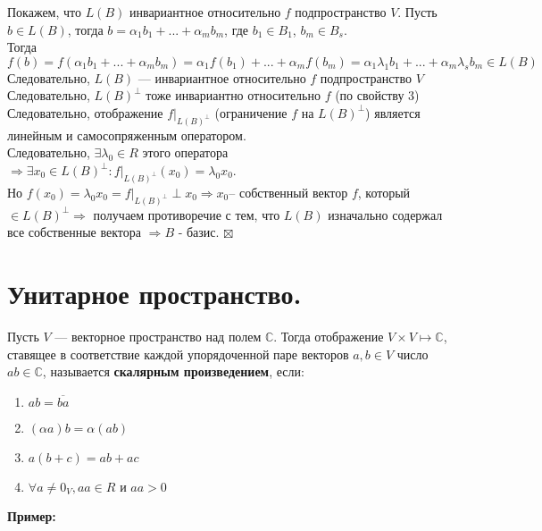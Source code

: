 \documentclass[a4paper, 12pt]{report}
\begin{document}
	Покажем, что $L(B)$ инвариантное относительно $f$ подпространство $V$. Пусть $b \in L(B)$,
	тогда $b = \alpha_1b_1 + ... + \alpha_mb_m$, где $b_1 \in B_1$, $b_m \in B_s$. \\
	Тогда $f(b) = f(\alpha_1b_1 + ... + \alpha_mb_m) = \alpha_1f(b_1) +... + \alpha_mf(b_m) = \alpha_1\lambda_1b_1 + ... + \alpha_m\lambda_sb_m \in L(B)$\\
	Следовательно, $L(B)$ --- инвариантное относительно $f$ подпространство $V$\\ 
	Следовательно, $L(B)^\perp$ тоже инвариантно относительно $f$ (по свойству 3)\\
	Следовательно, отображение $f|_{L(B)^\perp}$ (ограничение $f$ на $L(B)^\perp$) является линейным и самосопряженным оператором.\\
	Следовательно, $\exists \lambda_0 \in R$ этого оператора $\Rightarrow \exists x_0 \in L(B)^\perp: f|_{L(B)^\perp}(x_0) = \lambda_0x_0$. \\
	Но $f(x_0) = \lambda_0x_0 = f|_{L(B)^\perp}\perp x_0 \Rightarrow x_0 $– собственный вектор $f$, который $\in L(B)^\perp \Rightarrow$ получаем противоречие с тем, что $L(B)$ изначально содержал все собственные вектора $\Rightarrow B$ - базис. $\boxtimes$
	
	
	
	
	
	
	
	
	\section{Унитарное пространство.}
	\quad\;Пусть $V$ --- векторное пространство над полем $\mathbb{C}$. Тогда отображение $V \times V\mapsto \mathbb{C}$,
	ставящее в соответствие каждой упорядоченной паре векторов $a, b \in V$ число $ab\in \mathbb{C}$, называется \textbf{скалярным произведением}, если:
	\begin{enumerate}
		\item$ab = \overline{ba}$
		\item$(\alpha a)b = \alpha(ab)$
		\item$a(b + c) = ab + ac$
		\item$\forall  a \neq 0_{V} , aa \in R$  и $aa > 0$
	\end{enumerate}
	\textbf{Пример:}
	
\end{document}
